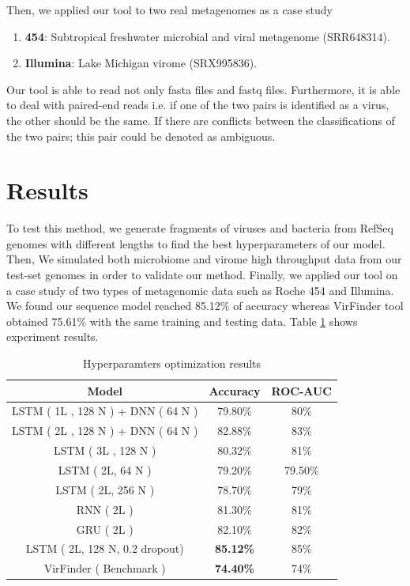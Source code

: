 \documentclass[conference]{IEEEtran}
\begin{document}
Then, we applied our tool to two real metagenomes as a case study
\begin{enumerate}
	\item \textbf{454}: Subtropical freshwater microbial and viral metagenome (SRR648314).\
	\item \textbf{Illumina}: Lake Michigan virome (SRX995836).
\end{enumerate}
Our tool is able to read not only fasta files and fastq files. Furthermore, it is able to deal with paired-end reads i.e. if one of the two pairs is identified as a virus, the other should be the same. If there are conflicts between the classifications of the two pairs; this pair could be denoted as ambiguous.


\section{Results}

To test this method, we generate fragments of viruses and bacteria from RefSeq genomes with different lengths to find the best hyperparameters of our model. Then, We simulated both microbiome and virome high throughput data from our test-set genomes in order to validate our method. Finally, we applied our tool on a case study of two types of metagenomic data such as Roche 454 and Illumina. We found our sequence model reached 85.12\% of accuracy whereas VirFinder tool obtained 75.61\% with the same training and testing data. Table \ref{table:model_results} shows experiment results.

\begin{table}[h!]
	\centering
	\begin{tabular}{||c c c||} 
		Model &	Accuracy&	ROC-AUC \\ [0.5ex] 
		\hline\hline
		LSTM ( 1L , 128 N ) + DNN ( 64 N ) &	79.80\% &	80\% \\
		LSTM ( 2L , 128 N ) + DNN ( 64 N ) &	82.88\%	& 83\% \\
		LSTM ( 3L , 128 N )  &	80.32\%	& 81\% \\ 
		LSTM ( 2L, 64 N ) &	79.20\%	& 79.50\% \\ 
		LSTM ( 2L, 256 N ) &	78.70\%	& 79\% \\
		RNN ( 2L ) &	81.30\%	& 81\% \\
		GRU ( 2L ) &	82.10\% &	82\% \\
		LSTM ( 2L, 128 N, 0.2 dropout) &	\textbf{85.12\%} 	& 85\% \\
		VirFinder ( Benchmark ) &	\textbf{74.40\%} &	74\% \\[1ex]
	\end{tabular}
	\caption{Hyperparamters optimization results}
	\label{table:model_results}
\end{table}
\end{document}
